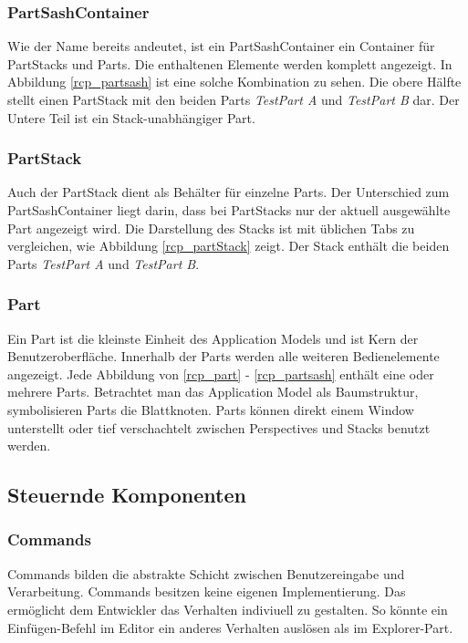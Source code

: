 \subsubsection{PartSashContainer}
Wie der Name bereits andeutet, ist ein PartSashContainer ein Container für PartStacks und Parts. Die enthaltenen Elemente werden komplett angezeigt. In Abbildung \ref{rcp_partsash} ist eine solche Kombination zu sehen. Die obere Hälfte stellt einen PartStack mit den beiden Parts \textit{TestPart A} und \textit{TestPart B} dar. Der Untere Teil ist ein Stack-unabhängiger Part.

\subsubsection{PartStack}
Auch der PartStack dient als Behälter für einzelne Parts. Der Unterschied zum PartSashContainer liegt darin, dass bei PartStacks nur der aktuell ausgewählte Part angezeigt wird. Die Darstellung des Stacks ist mit üblichen Tabs zu vergleichen, wie Abbildung \ref{rcp_partStack} zeigt. Der Stack enthält die beiden Parts \textit{TestPart A} und \textit{TestPart B}.

\subsubsection{Part}
Ein Part ist die kleinste Einheit des Application Models und ist Kern der Benutzeroberfläche\cite[org.eclipse.e4.ui.model.application.ui.basic]{eclipse:help}. Innerhalb der Parts werden alle weiteren Bedienelemente angezeigt. Jede Abbildung von \ref{rcp_part} - \ref{rcp_partsash} enthält eine oder mehrere Parts. Betrachtet man das Application Model als Baumstruktur, symbolisieren Parts die Blattknoten. Parts können direkt einem Window unterstellt oder tief verschachtelt zwischen Perspectives und Stacks benutzt werden.


\subsection{Steuernde Komponenten}
\subsubsection{Commands}
Commands bilden die abstrakte Schicht zwischen Benutzereingabe und Verarbeitung. Commands besitzen keine eigenen Implementierung. Das ermöglicht dem Entwickler das Verhalten indiviuell zu gestalten. So könnte ein Einfügen-Befehl im Editor ein anderes Verhalten auslösen als im Explorer-Part\cite[org.eclipse.ui.commands]{eclipse:help}.

